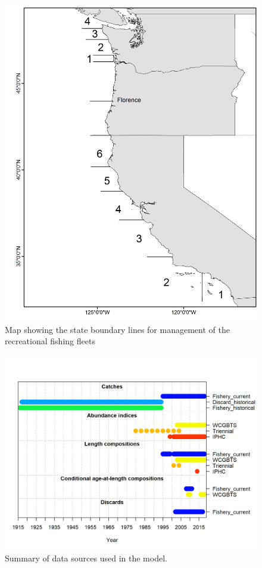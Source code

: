 \documentclass[12pt,]{article}
\begin{document}
\begin{figure}
\centering
\includegraphics{Figures/boundary_map.png}
\caption{Map showing the state boundary lines for management of the
recreational fishing fleets \label{fig:boundary_map}}
\end{figure}

\begin{figure}
\centering
\includegraphics{r4ss/plots_mod1/data_plot.png}
\caption{Summary of data sources used in the model.
\label{fig:data_plot}}
\end{figure}
\end{document}
